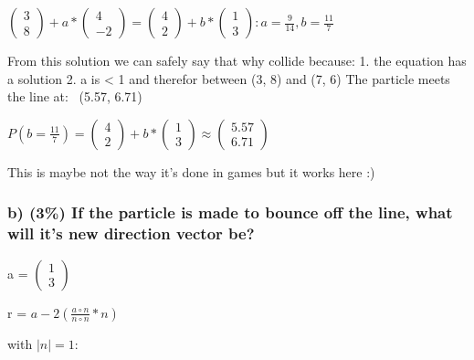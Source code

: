 $
    \left(\begin{array}{c}
        3\\
        8
    \end{array}\right)
    +
    a
    *
    \left(\begin{array}{c}
        4\\
        -2
    \end{array}\right)
=
    \left(\begin{array}{c}
        4\\
        2
    \end{array}\right)
    +
    b
    *
    \left(\begin{array}{c}
        1\\
        3
    \end{array}\right)
:
    a=\frac{9}{14}, b=\frac{11}{7}
$

From this solution we can safely say that why collide because:
   1. the equation has a solution
   2. a is < 1 and therefor between (3, 8) and (7, 6)
The particle meets the line at: ~(5.57, 6.71)

$
    P\left(
        b
        =
        \frac{11}{7}
    \right)
=
    \left(\begin{array}{c}
        4\\
        2
    \end{array}\right)
    +
    b
    *
    \left(\begin{array}{c}
        1\\
        3
    \end{array}\right)
\approx
    \left(\begin{array}{c}
        5.57\\
        6.71
    \end{array}\right)
$

This is maybe not the way it's done in games but it works here :)

\subsubsection{b) (3\%) If the particle is made to bounce off the line, what will it’s new direction vector be?}

a = $\left(\begin{array}{c}1\\3\end{array}\right)$

r = $ a - 2 \left(\frac{a \circ n}{n \circ n} * n\right)$

with $|n| = 1$:

